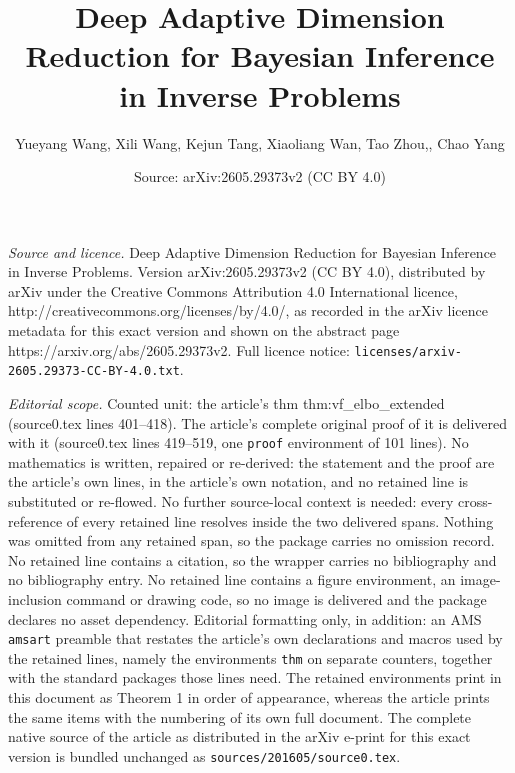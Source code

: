 \documentclass[10pt,a4paper]{amsart}
\title{Deep Adaptive Dimension Reduction for Bayesian Inference in Inverse Problems}
\author{Yueyang Wang, Xili Wang, Kejun Tang, Xiaoliang Wan, Tao Zhou,, Chao Yang}
\date{Source: arXiv:2605.29373v2 (CC BY 4.0)}
\begin{document}
\maketitle

\noindent\emph{Source and licence.} Deep Adaptive Dimension Reduction for Bayesian Inference in Inverse Problems. Version arXiv:2605.29373v2 (CC BY 4.0), distributed by arXiv under the Creative Commons Attribution 4.0 International licence, http://creativecommons.org/licenses/by/4.0/, as recorded in the arXiv licence metadata for this exact version and shown on the abstract page https://arxiv.org/abs/2605.29373v2. Full licence notice: \texttt{licenses/arxiv-2605.29373-CC-BY-4.0.txt}.\par\smallskip

\noindent\textit{Editorial scope.} Counted unit: the article's thm thm:vf\_elbo\_extended (source0.tex lines 401--418). The article's complete original proof of it is delivered with it (source0.tex lines 419--519, one \texttt{proof} environment of 101 lines). No mathematics is written, repaired or re-derived: the statement and the proof are the article's own lines, in the article's own notation, and no retained line is substituted or re-flowed.  No further source-local context is needed: every cross-reference of every retained line resolves inside the two delivered spans.  Nothing was omitted from any retained span, so the package carries no omission record.  No retained line contains a citation, so the wrapper carries no bibliography and no bibliography entry.  No retained line contains a figure environment, an image-inclusion command or drawing code, so no image is delivered and the package declares no asset dependency.  Editorial formatting only, in addition: an AMS \texttt{amsart} preamble that restates the article's own declarations and macros used by the retained lines, namely the environments \texttt{thm} on separate counters, together with the standard packages those lines need.  The retained environments print in this document as Theorem 1 in order of appearance, whereas the article prints the same items with the numbering of its own full document.  The complete native source of the article as distributed in the arXiv e-print for this exact version is bundled unchanged as \texttt{sources/201605/source0.tex}.
\end{document}
